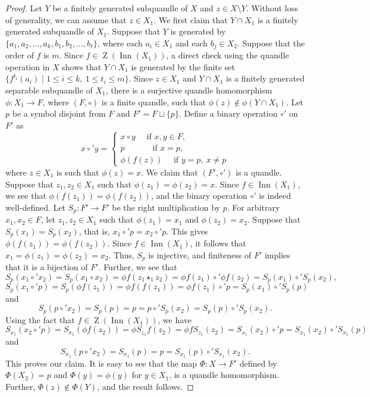 \documentclass[12pt]{amsart}
\theoremstyle{definition}
\numberwithin{equation}{subsection}
\newcommand{\Inn}{\operatorname{Inn}}
\newcommand{\Z}{\operatorname{Z}}
\begin{document}
\begin{proof}
Let $Y$ be a  finitely generated subquandle of $X$ and $z\in X\setminus Y$. Without loss of generality, we can assume that $z\in X_1$. We first claim that $Y\cap X_1$ is a finitely generated subquandle of $X_1$. Suppose that $Y$ is generated by $\{a_1,a_2,\ldots,a_k,b_1,b_2,\ldots,b_\ell\}$, where each $a_i\in X_1$ and each $b_j\in X_2$. Suppose that the order of $f$ is $m$. Since $f\in \Z(\Inn(X_1))$, a direct check using the quandle operation in $X$ shows that $Y\cap X_1$ is generated by the finite set $\{f^{t_i}(a_i)\mid 1\leq i\leq k, ~ 1\leq t_i\leq m\}$.  Since $z\in X_1$ and $Y\cap X_1$ is a finitely generated separable subquandle of $X_1$,  there is a surjective quandle homomorphism $\phi:X_1\to F$, where $(F,\circ)$ is a finite quandle, such that $\phi(z)\notin \phi(Y\cap X_1)$. Let $p$ be a symbol disjoint from $F$ and $F'=F\sqcup\{p\}$. Define a binary operation $\circ'$ on $F'$ as 
$$x\circ' y=\begin{cases}
			x\circ y \quad\text{ if } x,y\in F,\\
			p   \quad\quad\quad\text{ if } x=p,\\
			\phi(f(z)) \quad\text{ if } y=p,~x \ne p
		\end{cases}$$
where $z \in X_1$ is such that $\phi(z)=x$. We claim that $(F',\circ')$ is a quandle. Suppose that $z_1, z_2 \in X_1$ such that $\phi(z_1)=\phi(z_2)=x$. Since $f \in \Inn(X_1)$,
we see that  $\phi(f(z_1))= \phi(f(z_2))$, and the binary operation $\circ'$ is indeed well-defined. Let $S_p: F' \to F'$ be the right multiplication by $p$. For arbitrary $x_1, x_2 \in F$, let $z_1, z_2 \in X_1$ such that $\phi(z_1)=x_1$ and  $\phi(z_2)=x_2$.  Suppose that $S_p(x_1)=S_p(x_2)$, that is, $x_1 \circ' p= x_2 \circ' p$. This gives $\phi(f(z_1))= \phi(f(z_2))$. Since $f \in \Inn(X_1)$, it follows that $x_1=\phi(z_1)=\phi(z_2)=x_2$. Thus, $S_p$ is injective, and finiteness of $F'$ implies that it is a bijection of $F'$. Further, we see that 
$$S_p(x_1 \circ' x_2)= S_p(x_1 \circ x_2)= \phi f (z_1 \star_1 z_2) =\phi f(z_1) \circ' \phi f(z_2) = S_p(x_1) \circ' S_p(x_2),$$
$$S_p(x_1 \circ' p)= S_p(\phi f(z_1))= \phi f(f(z_1)) =\phi f(z_1) \circ' p = S_p(x_1) \circ' S_p(p)$$
and
$$S_p(p \circ' x_2)= S_p(p)=p =p \circ' S_p(x_2) = S_p(p) \circ' S_p(x_2).$$
Using the fact that $f \in \Z(\Inn(X_1))$, we have
$$S_{x_1}(x_2 \circ' p)= S_{x_1}(\phi f (z_2))=\phi S_{z_1} f(z_2)=\phi f S_{z_1}(z_2) = S_{x_1}(x_2) \circ' p = S_{x_1}(x_2) \circ' S_{x_1}(p)$$
and
$$S_{x_1}(p \circ' x_2)= S_{x_1}(p)=p= S_{x_1}(p) \circ' S_{x_1}(x_2).$$
This proves our claim. It is easy to see that the map $\Phi:X\to F'$ defined by $\Phi(X_2)=p$ and $\Phi(y)=\phi(y)$ for $y\in X_1$,  is a quandle homomorphism. Further, $\Phi(z)\notin \Phi(Y)$, and the result follows.
\end{proof}
\end{document}
